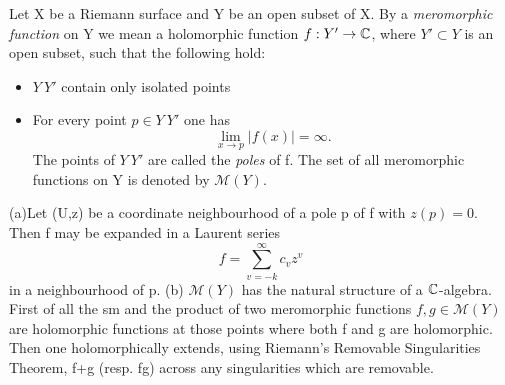\begin{dfn} Let X be a Riemann surface and Y be an open subset of X. 
 By a \textit{meromorphic function} on Y we mean a holomorphic function $f:Y' \to \mathbb{C}$, 
where $Y' \subset Y$ is an open subset, such that the following hold:
\begin{itemize}
 \item $Y\ Y'$ contain only isolated points
\item For every point $p \in Y\ Y'$ one has 
\begin{equation}
 \lim_{x \to p} |f(x)| = \infty.
\end{equation}
The points of $Y \ Y'$ are called the \textit{poles} of f. The set of all meromorphic functions on Y is denoted by 
$\mathcal{M}(Y)$.
\end{itemize}

\end{dfn}
\begin{rem}
 (a)Let (U,z) be a coordinate neighbourhood of a pole p of f with $z(p) = 0.$ Then f may be expanded in a Laurent
series 
\begin{equation}
 f = \sum_{v=-k}^{\infty} c_{v}z^{v}
\end{equation}
in a neighbourhood of p.
(b) $\mathcal{M}(Y)$ has the natural structure of a $\mathbb{C}$-algebra. First of all the sm and the product of two meromorphic 
functions $f,g \in \mathcal{M}(Y)$ are holomorphic functions at those points where both f and g are holomorphic. Then 
one holomorphically extends, using Riemann's Removable Singularities Theorem, f+g (resp. fg) across any
singularities which are removable.
\end{rem}
